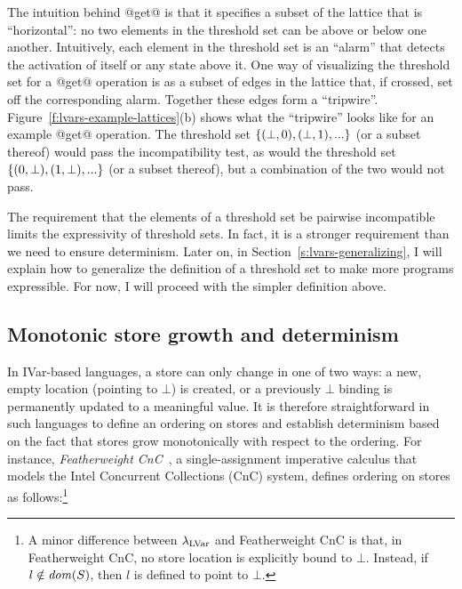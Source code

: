 The intuition behind @get@ is that it specifies a subset of the
lattice that is ``horizontal'': no two elements in the threshold set
can be above or below one another.  Intuitively, each element in the
threshold set is an ``alarm'' that detects the activation of itself or
any state above it.  One way of visualizing the threshold set for a
@get@ operation is as a subset of edges in the lattice that, if
crossed, set off the corresponding alarm.  Together these edges form a
``tripwire''.  Figure~\ref{f:lvars-example-lattices}(b) shows what the
``tripwire'' looks like for an example @get@ operation.  The
threshold set $\lbrace (\bot, 0), (\bot, 1), ... \rbrace$ (or a subset
thereof) would pass the incompatibility test, as would the threshold
set $\lbrace (0, \bot), (1, \bot), ... \rbrace$ (or a subset thereof), but
a combination of the two would not pass.

The requirement that the elements of a threshold set be pairwise
incompatible limits the expressivity of threshold sets.  In fact, it
is a stronger requirement than we need to ensure determinism.  Later
on, in Section~\ref{s:lvars-generalizing}, I will explain how to
generalize the definition of a threshold set to make more programs
expressible.  For now, I will proceed with the simpler definition
above.

\subsection{Monotonic store growth and determinism}\label{subsection:lvars-monotonic-store-growth}

In IVar-based languages, a store can only change in one of two ways: a
new, empty location (pointing to $\bot$) is created, or a previously
$\bot$ binding is permanently updated to a meaningful value.  It is
therefore straightforward in such languages to define an ordering on
stores and establish determinism based on the fact that stores grow
monotonically with respect to the ordering. For instance,
\emph{Featherweight CnC}~\cite{CnC}, a single-assignment imperative
calculus that models the Intel Concurrent Collections (CnC) system,
defines ordering on stores as follows:\footnote{A minor difference
  between $\lambda_{\textrm{LVar}}$ and Featherweight CnC is that, in
  Featherweight CnC, no store location is explicitly bound to $\bot$.
  Instead, if $l \notin \mathit{dom}(S)$, then $l$ is defined to point to
  $\bot$.}

\LVarsDefLeqStoreCnC


